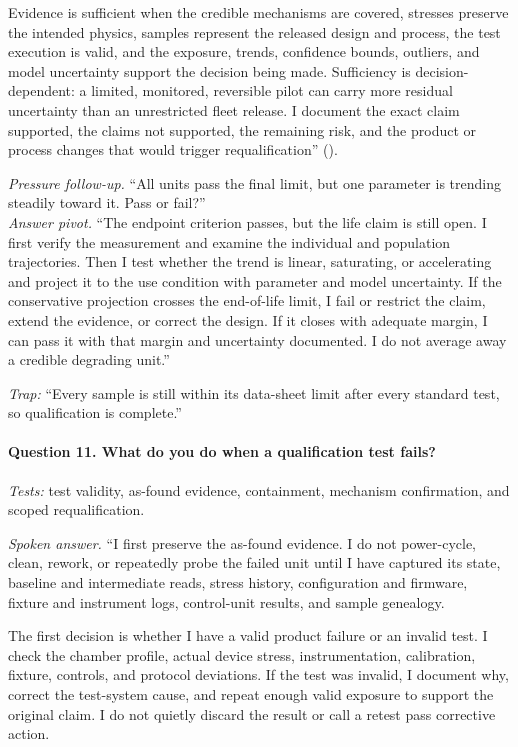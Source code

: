 Evidence is sufficient when the credible mechanisms are covered, stresses
preserve the intended physics, samples represent the released design and
process, the test execution is valid, and the exposure, trends, confidence
bounds, outliers, and model uncertainty support the decision being made.
Sufficiency is decision-dependent: a limited, monitored, reversible pilot can
carry more residual uncertainty than an unrestricted fleet release. I document
the exact claim supported, the claims not supported, the remaining risk, and
the product or process changes that would trigger requalification''
().

\textit{Pressure follow-up.} ``All units pass the final limit, but one
parameter is trending steadily toward it. Pass or fail?''\\
\textit{Answer pivot.} ``The endpoint criterion passes, but the life claim is
still open. I first verify the measurement and examine the individual and
population trajectories. Then I test whether the trend is linear, saturating,
or accelerating and project it to the use condition with parameter and model
uncertainty. If the conservative projection crosses the end-of-life limit, I
fail or restrict the claim, extend the evidence, or correct the design. If it
closes with adequate margin, I can pass it with that margin and uncertainty
documented. I do not average away a credible degrading unit.''

\textit{Trap:} ``Every sample is still within its data-sheet limit after every
standard test, so qualification is complete.''

\paragraph{Question 11. What do you do when a qualification test fails?}
\textit{Tests:} test validity, as-found evidence, containment, mechanism
confirmation, and scoped requalification.

\textit{Spoken answer.}
``I first preserve the as-found evidence. I do not power-cycle, clean, rework,
or repeatedly probe the failed unit until I have captured its state, baseline
and intermediate reads, stress history, configuration and firmware, fixture
and instrument logs, control-unit results, and sample genealogy.

The first decision is whether I have a valid product failure or an invalid
test. I check the chamber profile, actual device stress, instrumentation,
calibration, fixture, controls, and protocol deviations. If the test was
invalid, I document why, correct the test-system cause, and repeat enough valid
exposure to support the original claim. I do not quietly discard the result or
call a retest pass corrective action.

